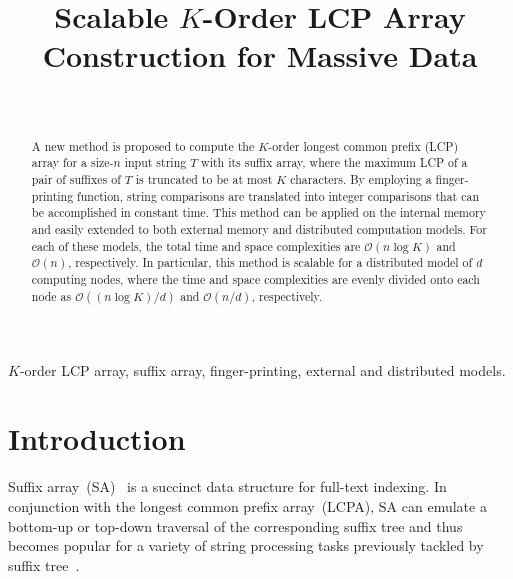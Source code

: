 \documentclass[article]{IEEEtran}
\theoremstyle{definition}
\theoremstyle{remark}
\numberwithin{equation}{section}
\begin{document}
\title{Scalable $K$-Order LCP Array Construction for Massive Data}

\author{ \\
}

\maketitle

\begin{abstract}
    A new method is proposed to compute the $K$-order longest common prefix (LCP) array for a size-$n$ input string $T$ with its suffix array, where the maximum LCP of a pair of suffixes of $T$ is truncated to be at most $K$ characters. By employing a finger-printing function, string comparisons are translated into integer comparisons that can be accomplished in constant time. This method can be applied on the internal memory and easily extended to both external memory and distributed computation models. For each of these models, the total time and space complexities are $\mathcal{O}(n\log K)$ and $\mathcal{O}(n)$, respectively. In particular, this method is scalable for a distributed model of $d$ computing nodes, where the time and space complexities are evenly divided onto each node as $\mathcal{O}((n\log K)/d)$ and $\mathcal{O}(n/d)$, respectively.
\end{abstract}

\begin{IEEEkeywords}
$K$-order LCP array, suffix array, finger-printing, external and distributed models.
\end{IEEEkeywords}


\section{Introduction}
Suffix array~(SA)~\cite{Manber1993} is a succinct data structure for full-text indexing. In conjunction with the longest common prefix array~(LCPA), SA can emulate a bottom-up or top-down traversal of the corresponding suffix tree and thus becomes popular for a variety of string processing tasks previously tackled by suffix tree~\cite{Abouelhodaa2004}.
\end{document}
